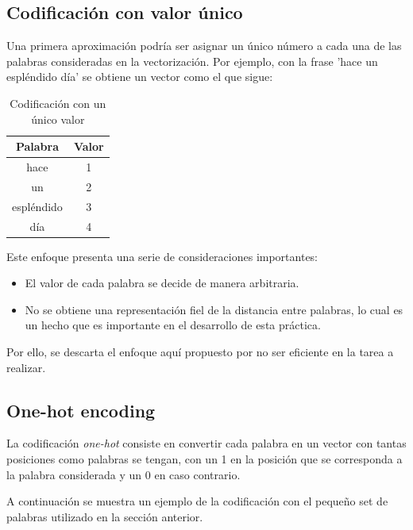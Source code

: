 \documentclass[12pt,a4paper, xcolor=table]{article}
\begin{document}
\subsection{Codificación con valor único}
Una primera aproximación podría ser asignar un único número a cada una de las palabras consideradas en la vectorización. Por ejemplo, con la frase 'hace un espléndido día' se obtiene un vector como el que sigue:

      \begin{table}[h]
        \centering
        \begin{tabular}{|c|c|}
        \hline
        \rowcolor[HTML]{DAE8FC}
        \textbf{Palabra} & \textbf{Valor} \\ \hline
        hace                    & 1   \\ \hline
        un                     & 2   \\ \hline
        espléndido                     & 3  \\ \hline
        día                       & 4   \\ \hline
        \end{tabular}
        \caption{Codificación con un único valor}
            \label{fig:graf_exp1}
    \end{table}

Este enfoque presenta una serie de consideraciones importantes:
\begin{itemize}
\item El valor de cada palabra se decide de manera arbitraria.
\item No se obtiene una representación fiel de la distancia entre palabras, lo cual es un hecho que es importante en el desarrollo de esta práctica.
\end{itemize}

Por ello, se descarta el enfoque aquí propuesto por no ser eficiente en la tarea a realizar.

\subsection{One-hot encoding}
La codificación \textit{one-hot} consiste en convertir cada palabra en un vector con tantas posiciones como palabras se tengan, con un 1 en la posición que se corresponda a la palabra considerada y un 0 en caso contrario.


\vspace{2mm}

A continuación se muestra un ejemplo de la codificación con el pequeño set de palabras utilizado en la sección anterior.
\end{document}

